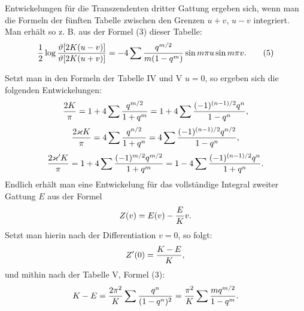 \documentclass[11pt]{article}
\begin{document}
Entwickelungen für die Transzendenten dritter Gattung ergeben sich, wenn man die Formeln der fünften Tabelle zwischen den Grenzen $u+v$, $u-v$ integriert. Man erhält so z. B. aus der Formel (3) dieser Tabelle:
\begin{equation}
{1\over2}\log{\vartheta[2K(u-v)]\over\vartheta[2K(u+v)]}
=-4\sum {q^{m/2}\over m(1-q^m)}\sin m\pi u\sin m\pi v.
\tag{5}
\end{equation}

Setzt man in den Formeln der Tabelle IV und V $u=0$, so ergeben sich die folgenden Entwickelungen:
\[
{2K\over\pi}=1+4\sum{q^{m/2}\over1+q^m}
=1+4\sum{(-1)^{(n-1)/2}q^n\over1-q^n},
\]
\[
{2\varkappa K\over\pi}=4\sum{q^{n/2}\over1+q^n}
=4\sum{(-1)^{(n-1)/2}q^{n/2}\over1-q^n},
\]
\[
{2\varkappa' K\over\pi}=1+4\sum{(-1)^{m/2}q^{m/2}\over1+q^m}
=1-4\sum{(-1)^{(n-1)/2}q^n\over1+q^n}.
\]
Endlich erhält man eine Entwickelung für das vollständige Integral zweiter Gattung $E$ aus der Formel
\[
Z(v)=E(v)-{E\over K}v.
\]
Setzt man hierin nach der Differentiation $v=0$, so folgt:
\[
Z'(0)={K-E\over K},
\]
und mithin nach der Tabelle V, Formel (3):
\[
K-E={2\pi^2\over K}\sum {q^n\over(1-q^n)^2}
={\pi^2\over K}\sum {m q^{m/2}\over1-q^m}.
\]
\end{document}
